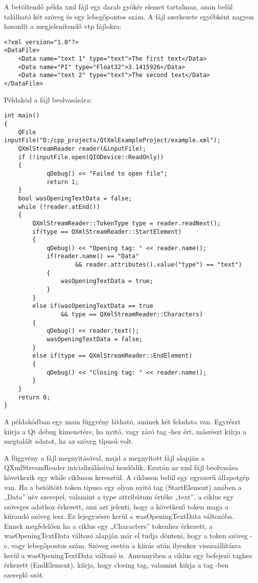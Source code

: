 A betöltendő példa xml fájl egy darab gyökér elemet tartalmaz, 
amin belül található két szöveg és egy lebegőpontos szám. 
A fájl szerkezete egyébként nagyon hasonlít a megjelenítendő vtp fájlokra:
\begin{lstlisting}[style=customxml]
<?xml version="1.0"?>
<DataFile>
    <Data name="text 1" type="text">The first text</Data>
    <Data name="PI" type="Float32">3.1415926</Data>
    <Data name="text 2" type="text">The second text</Data>      
</DataFile>
\end{lstlisting}
Példakód a fájl beolvasására:
\begin{lstlisting}[style=customcpp]
int main()
{
    QFile inputFile("D:/cpp_projects/QtXmlExampleProject/example.xml");
    QXmlStreamReader reader(&inputFile);
    if (!inputFile.open(QIODevice::ReadOnly))
    {
            qDebug() << "Failed to open file";
            return 1;
    }
    bool wasOpeningTextData = false;
    while (!reader.atEnd())
    {
        QXmlStreamReader::TokenType type = reader.readNext();
        if(type == QXmlStreamReader::StartElement)
        {
            qDebug() << "Opening tag: " << reader.name();
            if(reader.name() == "Data" 
                    && reader.attributes().value("type") == "text")
            {
                wasOpeningTextData = true;
            }
        }
        else if(wasOpeningTextData == true 
                && type == QXmlStreamReader::Characters)
        {
            qDebug() << reader.text();
            wasOpeningTextData = false;
        }
        else if(type == QXmlStreamReader::EndElement)
        {
            qDebug() << "Closing tag: " << reader.name();
        }
    }
    return 0;
}
\end{lstlisting}
A példakódban egy main függvény látható, 
aminek két feladata van. 
Egyrészt kiírja a Qt debug kimenetére, 
ha nyitó, vagy záró tag -hez ért, másrészt kiírja a megtalált adatot, 
ha az szöveg típusú volt.

\begin{sloppypar}
A függvény a fájl megnyitásával, 
majd a megnyitott fájl alapján a 
{\ttfamily QXmlStreamReader} inicializálásával kezdődik. 
Ezután az xml fájl beolvasása következik egy while cikluson keresztül. 
A cikluson belül egy egyszerű állapotgép van. 
Ha a betöltött token típusa egy olyan nyitó tag ({\ttfamily StartElement}) 
amiben a {\ttfamily „Data”} név szerepel, 
valamint a {\ttfamily type} attribútum értéke {\ttfamily „text”}, 
a ciklus egy szöveges adathoz érkezett, 
ami azt jelenti, 
hogy a következő token maga a kiírandó szöveg lesz. 
Ez lejegyzésre kerül a {\ttfamily wasOpeningTextData} változóba. 
Ennek megfelelően ha a ciklus egy {\ttfamily „Characters”} tokenhez érkezett, 
a {\ttfamily wasOpeningTextData} változó alapján már el tudja dönteni, 
hogy a token szöveg -e, vagy lebegőpontos szám. 
Szöveg esetén a kiírás után ilyenkor visszaállításra kerül 
a {\ttfamily wasOpeningTextData} változó is. 
Amennyiben a ciklus egy befejező taghez érkezett ({\ttfamily EndElement}), 
kiírja, hogy closing tag, 
valamint kiírja a tag -ben szereplő szót.
\end{sloppypar}

